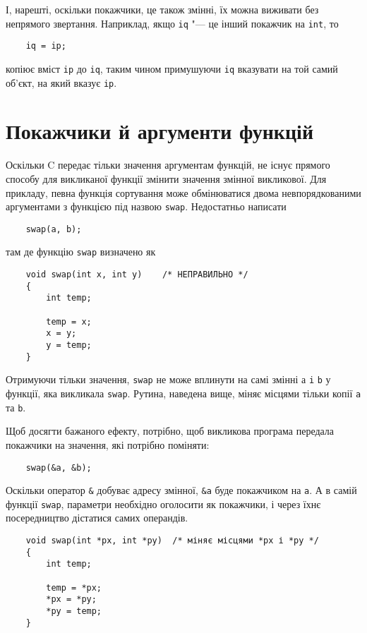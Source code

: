 \documentclass[a4paper,12pt]{book}
\begin{document}
  І, нарешті, оскільки покажчики, це також змінні, їх можна виживати без непрямого
  звертання. Наприклад, якщо \texttt{iq} "--- це інший покажчик на \texttt{int}, то
  \begin{verbatim}
    iq = ip;
  \end{verbatim}
  копіює вміст
  \texttt{ip} до
  \texttt{iq}, таким чином примушуючи
  \texttt{iq} вказувати на той самий об'єкт, на який вказує
  \texttt{ip}.

\section{Покажчики й аргументи функцій}


  Оскільки C передає тільки значення аргументам функцій, не існує прямого способу для
  викликаної функції змінити значення змінної викликової. Для прикладу, певна функція
  сортування може обмінюватися двома невпорядкованими аргументами з функцією під назвою
  \texttt{swap}. Недостатньо написати
  \begin{verbatim}
    swap(a, b);
  \end{verbatim}
  там де функцію \texttt{swap} визначено як
  \begin{verbatim}
    void swap(int x, int y)    /* НЕПРАВИЛЬНО */
    {
        int temp;

        temp = x;
        x = y;
        y = temp;
    }
  \end{verbatim}

  Отримуючи тільки значення, \texttt{swap} не може вплинути на самі змінні а \texttt{i}
  \texttt{b} у функції, яка викликала \texttt{swap}. Рутина, наведена вище, міняє місцями
  тільки копії \texttt{a} та \texttt{b}.

  Щоб досягти бажаного ефекту, потрібно, щоб викликова програма передала покажчики на
  значення, які потрібно поміняти:
  \begin{verbatim}
    swap(&a, &b);
  \end{verbatim}

  Оскільки оператор \texttt{\&} добуває адресу змінної, \texttt{\&a} буде покажчиком
  на \texttt{a}. А в самій функції \texttt{swap}, параметри необхідно оголосити як
  покажчики, і через їхнє посередництво дістатися самих операндів.

  \begin{verbatim}
    void swap(int *px, int *py)  /* міняє місцями *px і *py */
    {
        int temp;

        temp = *px;
        *px = *py;
        *py = temp;
    }
  \end{verbatim}
\end{document}
